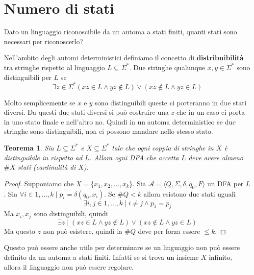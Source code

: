 \documentclass[12pt]{article}
\newtheorem{teorema}{Teorema}
\begin{document}
\tableofcontents
\newpage
\section{Numero di stati}
Dato un linguaggio riconoscibile da un automa a stati finiti, quanti stati sono necessari per riconoscerlo?

Nell'ambito degli automi deterministici definiamo il concetto di \textbf{distribuibilità} tra stringhe rispetto al linguaggio $L \subseteq \Sigma^*$.
Due stringhe qualunque $x, y \in \Sigma^*$ sono distinguibili per $L$ se 
$$ \exists z \in \Sigma^* (xz \in L \wedge yz \not \in L) \vee (xz \not \in L \wedge yz \in L) $$

Molto semplicemente se $x$ e $y$ sono distinguibili queste ci porteranno in due stati diversi.
Da questi due stati diversi si può costruire una $z$ che in un caso ci porta in uno stato finale e nell'altro no.
Quindi in un automa deterministico se due stringhe sono distinguibili, non ci possono mandare nello stesso stato.

\begin{teorema}
	Sia $L \subseteq \Sigma^*$ e $X \subseteq \Sigma^*$ tale che ogni coppia di stringhe in $X$ è distinguibile in rispetto ad $L$.
 	Allora ogni DFA che accetta $L$ deve avere almeno $\# X$ stati (cardinalità di $X$).
\end{teorema}
\begin{proof}
	Supponiamo che $X = \{x_1, x_2, \dots, x_k \}$.
	Sia $\mathcal{A} = \langle Q, \Sigma, \delta, q_0, F \rangle$ un DFA per $L$.
	Sia $\forall i \in 1, \dots, k \mid p_i = \delta(q_0, x_i)$.
	Se $\# Q < k$ allora esistono due stati uguali
	$$ \exists i, j \in 1, \dots, k \mid i \neq j \wedge p_1 = p_j $$
	Ma $x_i, x_j$ sono distinguibili, quindi
	$$ \exists z \mid (xz \in L \wedge yz \not \in L) \vee (xz \not \in L \wedge yz \in L) $$
	Ma questo $z$ non può esistere, quindi la $\# Q$ deve per forza essere $\leq k$.
\end{proof}
Questo può essere anche utile per determinare se un linguaggio non può essere definito da un automa a stati finiti.
Infatti se si trova un insieme $X$ infinito, allora il linguaggio non può essere regolare.
\end{document}
